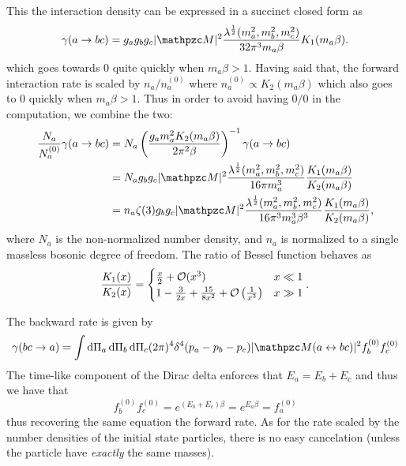 \documentclass{scrartcl}
\begin{document}
This the interaction density can be expressed in a succinct closed form as
\begin{equation}
  \gamma(a \to bc) = g_a g_b g_c \abs{\pzcM}^2
  \frac{\lambda^{\frac{1}{2}}(m_a^2, m_b^2, m_c^2)}{32 \pi^3 m_a \beta} K_1(m_a \beta).
\end{equation}
which goes towards 0 quite quickly when \(m_a \beta > 1\).  Having said that,
the forward interaction rate is scaled by \(n_a / n_a^{(0)}\) where \(n_a^{(0)}
\propto K_2(m_a \beta)\) which also goes to 0 quickly when \(m_a \beta > 1\).
Thus in order to avoid having \(0 / 0\) in the computation, we combine the two:
\begin{equation}
  \begin{aligned}
    \frac{N_a}{N_a^{(0)}} \gamma(a \to bc)
     & = N_a \left( \frac{g_a m_a^2 K_2(m_a \beta)}{2 \pi^2 \beta} \right)^{-1} \gamma(a \to bc) \\
     & = N_a g_b g_c \abs{\pzcM}^2
    \frac{\lambda^{\frac{1}{2}}(m_a^2, m_b^2, m_c^2)}{16 \pi m_a^3}
    \frac{K_1(m_a \beta)}{K_2(m_a \beta)}                                                        \\
     & = n_a \zeta(3) g_b g_c \abs{\pzcM}^2
    \frac{\lambda^{\frac{1}{2}}(m_a^2, m_b^2, m_c^2)}{16 \pi^3 m_a^3 \beta^3}
    \frac{K_1(m_a \beta)}{K_2(m_a \beta)},
  \end{aligned}
\end{equation}
where \(N_a\) is the non-normalized number density, and \(n_a\) is normalized to
a single massless bosonic degree of freedom.  The ratio of Bessel function
behaves as
\begin{equation}
  \frac{K_1(x)}{K_2(x)} = \begin{cases}
    \frac{x}{2} + \mathcal{O}(x^3)                                              & x \ll 1 \\
    1 - \frac{3}{2x} + \frac{15}{8 x^2} + \mathcal{O}\left(\frac{1}{x^3}\right) & x \gg 1
  \end{cases}.
\end{equation}

The backward rate is given by
\begin{equation}
  \gamma(bc \to a) = \int \dd\Pi_a \dd\Pi_b \dd\Pi_c (2\pi)^4 \delta^4(p_a - p_b - p_c) \abs{\pzcM(a \leftrightarrow bc)}^2 f_b^{(0)} f_c^{(0)}
\end{equation}
The time-like component of the Dirac delta enforces that \(E_a = E_b + E_c\) and
thus we have that
\begin{equation}
  f_b^{(0)} f_c^{(0)} = e^{(E_b + E_c) \beta} = e^{E_a \beta} = f_a^{(0)}
\end{equation}
thus recovering the same equation the forward rate.  As for the rate scaled by
the number densities of the initial state particles, there is no easy
cancelation (unless the particle have \emph{exactly} the same masses).
\end{document}
